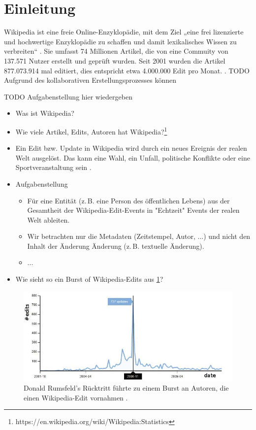 \section{Einleitung}
Wikipedia ist eine freie Online-Enzyklopädie, mit dem Ziel „eine frei lizenzierte und hochwertige Enzyklopädie zu schaffen und damit lexikalisches Wissen zu verbreiten“ \cite{wales.}. Sie umfasst 74 Millionen Artikel, die von eine Commuity von 137.571 Nutzer erstellt und geprüft wurden. Seit 2001 wurden die Artikel 877.073.914 mal editiert, dies entspricht etwa 4.000.000 Edit pro Monat. \cite{wikistat}.
TODO
Aufgrund des kollaborativen Erstellungsprozesses können \cite{wikipedia.}

TODO
Aufgabenstellung hier wiedergeben

\begin{itemize}
    \item Was ist Wikipedia?
    \item Wie viele Artikel, Edits, Autoren hat Wikipedia?\footnote{https://en.wikipedia.org/wiki/Wikipedia:Statistics}
    \item Ein Edit bzw. Update in Wikipedia wird durch ein neues Ereignis der realen Welt ausgelöst. Das kann eine Wahl,
    ein Unfall, politische Konflikte oder eine Sportveranstaltung sein \cite{10.1007978-3-642-36973-5_22}.
    \item Aufgabenstellung
    \begin{itemize}
        \item Für eine Entität (z.\,B. eine Person des öffentlichen Lebens) aus der Gesamtheit der Wikipedia-Edit-Events in "Echtzeit"
        Events der realen Welt ableiten.
        \item Wir betrachten nur die Metadaten (Zeitstempel, Autor, ...) und nicht den Inhalt der Änderung Änderung (z.\,B. textuelle Änderung).
        \item ...
    \end{itemize}
    \item Wie sieht so ein Burst of Wikipedia-Edits aus \ref{fig:donald_rumsfelds_resignation_burst}?
\end{itemize}


\begin{figure}[h]
    \includegraphics[width=.5\textwidth]{images/Extracting_EventRelated_Information_from_Article.jpg}
    \caption{Donald Rumsfeld’s Rücktritt führte zu einem Burst an Autoren, die einen Wikipedia-Edit vornahmen \cite{10.1007978-3-642-36973-5_22}.}
    \label{fig:donald_rumsfelds_resignation_burst}
\end{figure}